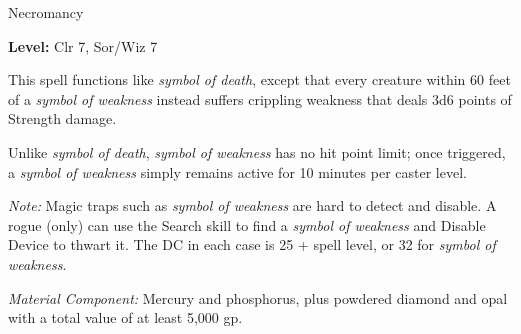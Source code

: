 
Necromancy

\textbf{Level:} Clr 7, Sor/Wiz 7

This spell functions like \textit{symbol of death}, except that every creature 
within 60 feet of a \textit{symbol of weakness} instead suffers crippling weakness 
that deals 3d6 points of Strength damage.

Unlike \textit{symbol of death}, \textit{symbol of weakness} has no hit point limit; 
once triggered, a \textit{symbol of weakness} simply remains active for 10 minutes 
per caster level.

\textit{Note:} Magic traps such as \textit{symbol of weakness} are hard to detect 
and disable. A rogue (only) can use the Search skill to find a \textit{symbol of 
weakness} and Disable Device to thwart it. The DC in each case is 25 + spell level, 
or 32 for \textit{symbol of weakness}.

\textit{Material Component:} Mercury and phosphorus, plus powdered diamond and 
opal with a total value of at least 5,000 gp.

